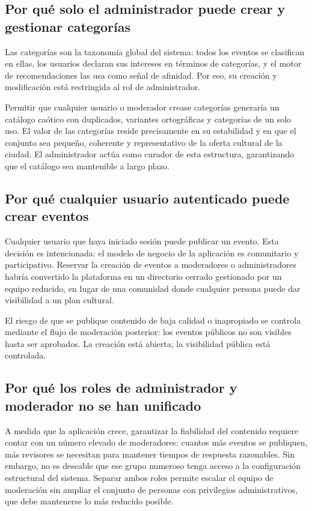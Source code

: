 \subsection{Por qué solo el administrador puede crear y gestionar categorías}

Las categorías son la taxonomía global del sistema: todos los eventos se clasifican en ellas, los usuarios declaran sus intereses en términos de categorías, y el motor de recomendaciones las usa como señal de afinidad. Por eso, su creación y modificación está restringida al rol de administrador.

Permitir que cualquier usuario o moderador crease categorías generaría un catálogo caótico con duplicados, variantes ortográficas y categorías de un solo uso. El valor de las categorías reside precisamente en su estabilidad y en que el conjunto sea pequeño, coherente y representativo de la oferta cultural de la ciudad. El administrador actúa como curador de esta estructura, garantizando que el catálogo sea mantenible a largo plazo.

\subsection{Por qué cualquier usuario autenticado puede crear eventos}

Cualquier usuario que haya iniciado sesión puede publicar un evento. Esta decisión es intencionada: el modelo de negocio de la aplicación es comunitario y participativo. Reservar la creación de eventos a moderadores o administradores habría convertido la plataforma en un directorio cerrado gestionado por un equipo reducido, en lugar de una comunidad donde cualquier persona puede dar visibilidad a un plan cultural.

El riesgo de que se publique contenido de baja calidad o inapropiado se controla mediante el flujo de moderación posterior: los eventos públicos no son visibles hasta ser aprobados. La creación está abierta; la visibilidad pública está controlada.

\subsection{Por qué los roles de administrador y moderador no se han unificado}

A medida que la aplicación crece, garantizar la fiabilidad del contenido requiere contar con un número elevado de moderadores: cuantos más eventos se publiquen, más revisores se necesitan para mantener tiempos de respuesta razonables. Sin embargo, no es deseable que ese grupo numeroso tenga acceso a la configuración estructural del sistema. Separar ambos roles permite escalar el equipo de moderación sin ampliar el conjunto de personas con privilegios administrativos, que debe mantenerse lo más reducido posible.


